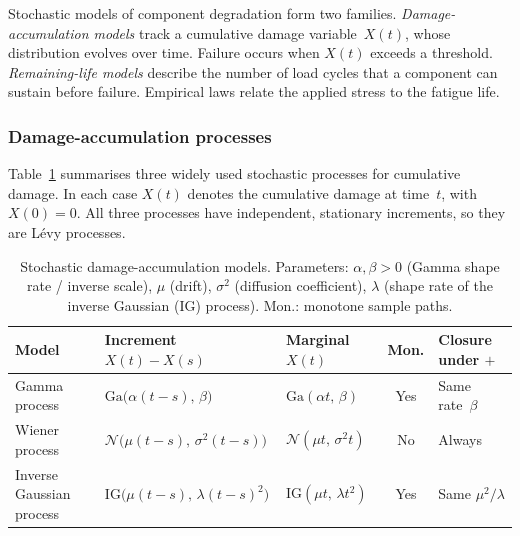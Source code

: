 \documentclass[11pt,a4paper]{article}
\theoremstyle{plain}
\theoremstyle{definition}
\theoremstyle{remark}
\begin{document}
\label{sec:deg_families}
Stochastic models of component degradation form two families.
\emph{Damage-accumulation models} track a cumulative damage variable~$X(t)$, whose distribution evolves over time.
Failure occurs when $X(t)$ exceeds a threshold.
\emph{Remaining-life models} describe the number of load cycles that a component can sustain before failure.
Empirical laws relate the applied stress to the fatigue life.

\subsubsection{Damage-accumulation processes}

Table~\ref{tab:deg_models} summarises three widely used stochastic processes for cumulative damage.
In each case $X(t)$ denotes the cumulative damage at time~$t$, with $X(0)=0$.
All three processes have independent, stationary increments, so they are L\'evy processes.

\begin{table}[htbp]
\centering
\caption{Stochastic damage-accumulation models.
Parameters: $\alpha,\beta>0$ (Gamma shape rate / inverse scale), $\mu$ (drift), $\sigma^2$ (diffusion coefficient), $\lambda$ (shape rate of the inverse Gaussian (IG) process).
Mon.: monotone sample paths.}
\label{tab:deg_models}
\small
\begin{tabularx}{\linewidth}{@{}>{\hsize=0.976\hsize\raggedright\arraybackslash}X>{\hsize=1.171\hsize\raggedright\arraybackslash}X>{\hsize=0.715\hsize\raggedright\arraybackslash}Xc>{\hsize=1.138\hsize\raggedright\arraybackslash}X@{}}
\toprule
\rowcolor{headgrey}
\textbf{Model} & \textbf{Increment} $X(t)-X(s)$ & \textbf{Marginal} $X(t)$ & \textbf{Mon.} & \textbf{Closure under $+$} \\
\midrule
Gamma process \cite{AbdelHameed1975}
  & $\mathrm{Ga}\!\bigl(\alpha(t{-}s),\,\beta\bigr)$
  & $\mathrm{Ga}(\alpha t,\,\beta)$
  & Yes
  & Same rate~$\beta$ \\[4pt]
Wiener process \cite{WhitmoreSchenkelberg1997}
  & $\mathcal{N}\!\bigl(\mu(t{-}s),\,\sigma^2(t{-}s)\bigr)$
  & $\mathcal{N}(\mu t,\,\sigma^2 t)$
  & No
  & Always \\[4pt]
Inverse Gaussian process \cite{YeChen2014}
  & $\mathrm{IG}\!\bigl(\mu(t{-}s),\,\lambda(t{-}s)^2\bigr)$
  & $\mathrm{IG}(\mu t,\,\lambda t^2)$
  & Yes
  & Same $\mu^2/\lambda$ \\[4pt]
\bottomrule
\end{tabularx}
\end{table}
\end{document}
